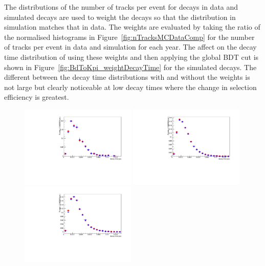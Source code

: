 The distributions of the number of tracks per event for \bdkpi decays in data and simulated decays are used to weight the \bdkpi decays so that the distribution in simulation matches that in data. The weights are evaluated by taking the ratio of the normalised histograms in Figure~\ref{fig:nTracksMCDataComp} for the number of tracks per event in data and simulation for each year. The affect on the decay time distribution of using these weights and then applying the global BDT cut is shown in Figure~\ref{fig:BdToKpi_weightDecayTime} for the simulated \bdkpi decays. The different between the decay time distributions with and without the weights is not large but clearly noticeable at low decay times where the change in selection efficiency is greatest. 

\begin{figure}[htbp]
  \centering
    \includegraphics[width=0.49\textwidth]{./Figs/LifetimeMeasurement/2011_B_TAU_Bd2KPi_MC_weighted_and_unweighted.pdf}
    \includegraphics[width=0.49\textwidth]{./Figs/LifetimeMeasurement/2012_B_TAU_Bd2KPi_MC_weighted_and_unweighted.pdf}
    \includegraphics[width=0.49\textwidth]{./Figs/LifetimeMeasurement/2015_B_TAU_Bd2KPi_MC_weighted_and_unweighted.pdf}

\end{figure}
